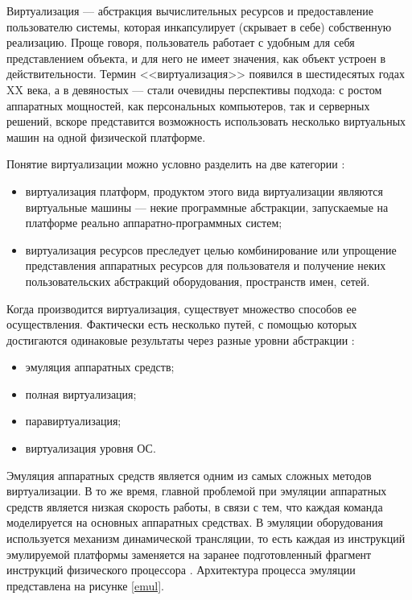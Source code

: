 Виртуализация --- абстракция вычислительных ресурсов и предоставление пользователю системы, которая инкапсулирует (скрывает в себе) собственную реализацию.
Проще говоря, пользователь работает с удобным для себя представлением объекта, и для него не имеет значения, как объект устроен в действительности.
Термин <<виртуализация>> появился в шестидесятых годах XX века, а в девяностых --- стали очевидны перспективы подхода: с ростом аппаратных мощностей, как персональных компьютеров, так и серверных решений, вскоре представится возможность использовать несколько виртуальных машин на одной физической платформе.

Понятие виртуализации можно условно разделить на две категории \cite{ibm-virt}:
\begin{itemize}
  \item виртуализация платформ, продуктом этого вида виртуализации являются виртуальные машины --- некие программные абстракции, запускаемые на платформе реально аппаратно-программных систем;
  \item виртуализация ресурсов преследует целью комбинирование или упрощение представления аппаратных ресурсов для пользователя и получение неких пользовательских абстракций оборудования, пространств имен, сетей.
\end{itemize}

Когда производится виртуализация, существует множество способов ее осуществления.
Фактически есть несколько путей, с помощью которых достигаются одинаковые результаты через разные уровни абстракции \cite{openvz-tutorial}:
\begin{itemize}
  \item эмуляция аппаратных средств;
  \item полная виртуализация;
  \item паравиртуализация;
  \item виртуализация уровня ОС.
\end{itemize}

Эмуляция аппаратных средств является одним из самых сложных методов виртуализации.
В то же время, главной проблемой при эмуляции аппаратных средств является низкая скорость работы, в связи с тем, что каждая команда моделируется на основных аппаратных средствах.
В эмуляции оборудования используется механизм динамической трансляции, то есть каждая из инструкций эмулируемой платформы заменяется на заранее подготовленный фрагмент инструкций физического процессора \cite{qemu-ibm}.
Архитектура процесса эмуляции представлена на рисунке \ref{emul}.

